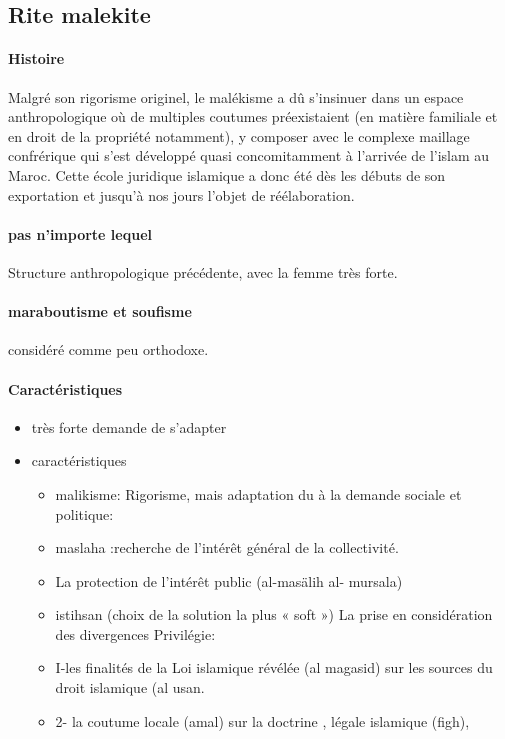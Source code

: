 \subsection{Rite malekite}

\paragraph{Histoire}

 Malgré son rigorisme originel, le malékisme a dû s'insinuer dans un espace anthropologique où de multiples coutumes préexistaient (en matière familiale et en droit de la propriété notamment), y composer avec le complexe maillage confrérique qui s'est développé quasi concomitamment à l'arrivée de l'islam au Maroc.
  Cette école juridique islamique a donc été dès les débuts de son exportation et jusqu'à nos jours l'objet de réélaboration.



\paragraph{pas n'importe lequel}
Structure anthropologique précédente, avec la femme très forte.

\paragraph{maraboutisme et soufisme} considéré comme peu orthodoxe. 


\paragraph{Caractéristiques}

\begin{itemize}
    \item très forte demande de s'adapter
    \item caractéristiques
    \begin{itemize}
        \item   malikisme: Rigorisme, mais adaptation du à la demande sociale et politique:
       \item maslaha :recherche de l'intérêt général de la collectivité.
       \item La protection de l'intérêt public (al-masälih al-
mursala)
     \item  istihsan (choix de la solution la plus « soft »)   La prise en considération des divergences
  Privilégie:
       \item I-les finalités de la Loi islamique révélée (al magasid) 
  sur les sources du droit islamique (al usan.
       \item 2- la coutume locale 
  (amal) sur la doctrine , légale islamique (figh),
    \end{itemize}

\end{itemize}

